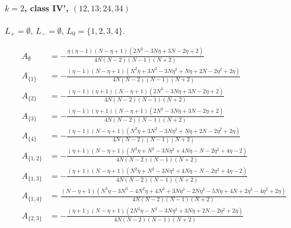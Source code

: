 \documentclass[11pt]{article}
\begin{document}
\paragraph{$k=2$, class IV', $(12,13;24,34)$}

$L_+=\emptyset$, $L_-=\emptyset$, $L_0=\{1,2,3,4\}$.

\begin{align*}
  A_{\emptyset} &= - \frac{\eta \left(\eta - 1\right) \left(N - \eta + 1\right) \left(2 N^{2} - 3 N \eta + 3 N - 2 \eta + 2\right)}{4 N \left(N - 2\right) \left(N - 1\right) \left(N + 2\right)} \\
  A_{\{1\}} &= - \frac{\left(\eta - 1\right) \left(N - \eta + 1\right) \left(N^{2} \eta + 3 N^{2} - 3 N \eta^{2} + N \eta + 2 N - 2 \eta^{2} + 2 \eta\right)}{4 N \left(N - 2\right) \left(N - 1\right) \left(N + 2\right)} \\
  A_{\{2\}} &= - \frac{\left(\eta - 1\right) \left(\eta + 1\right) \left(N - \eta + 1\right) \left(2 N^{2} - 3 N \eta + 3 N - 2 \eta + 2\right)}{4 N \left(N - 2\right) \left(N - 1\right) \left(N + 2\right)} \\
  A_{\{3\}} &= - \frac{\left(\eta - 1\right) \left(\eta + 1\right) \left(N - \eta + 1\right) \left(2 N^{2} - 3 N \eta + 3 N - 2 \eta + 2\right)}{4 N \left(N - 2\right) \left(N - 1\right) \left(N + 2\right)} \\
  A_{\{4\}} &= - \frac{\left(\eta - 1\right) \left(N - \eta + 1\right) \left(N^{2} \eta + 3 N^{2} - 3 N \eta^{2} + N \eta + 2 N - 2 \eta^{2} + 2 \eta\right)}{4 N \left(N - 2\right) \left(N - 1\right) \left(N + 2\right)} \\
  A_{\{1,2\}} &= - \frac{\left(\eta + 1\right) \left(N - \eta + 1\right) \left(N^{2} \eta + N^{2} - 3 N \eta^{2} + 4 N \eta - N - 2 \eta^{2} + 4 \eta - 2\right)}{4 N \left(N - 2\right) \left(N - 1\right) \left(N + 2\right)} \\
  A_{\{1,3\}} &= - \frac{\left(\eta + 1\right) \left(N - \eta + 1\right) \left(N^{2} \eta + N^{2} - 3 N \eta^{2} + 4 N \eta - N - 2 \eta^{2} + 4 \eta - 2\right)}{4 N \left(N - 2\right) \left(N - 1\right) \left(N + 2\right)} \\
  A_{\{1,4\}} &= \frac{\left(N - \eta + 1\right) \left(N^{3} \eta - 3 N^{3} - 4 N^{2} \eta + 4 N^{2} + 3 N \eta^{3} - 2 N \eta^{2} - 5 N \eta + 4 N + 2 \eta^{3} - 4 \eta^{2} + 2 \eta\right)}{4 N \left(N - 2\right) \left(N - 1\right) \left(N + 2\right)} \\
  A_{\{2,3\}} &= - \frac{\left(\eta + 1\right) \left(N - \eta + 1\right) \left(2 N^{2} \eta - N^{2} - 3 N \eta^{2} + 3 N \eta + 2 N - 2 \eta^{2} + 2 \eta\right)}{4 N \left(N - 2\right) \left(N - 1\right) \left(N + 2\right)} \\

\end{align*}
\end{document}
